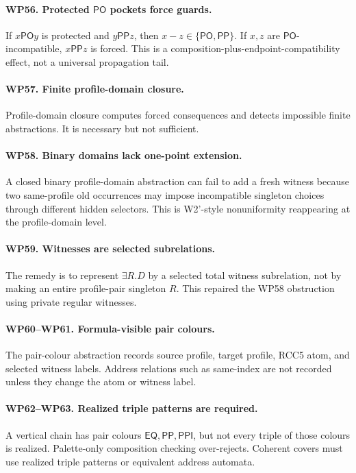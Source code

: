 \documentclass[11pt]{article}
\newcommand{\EQ}{\mathsf{EQ}}
\newcommand{\PP}{\mathsf{PP}}
\newcommand{\PPI}{\mathsf{PPI}}
\newcommand{\PO}{\mathsf{PO}}
\begin{document}
\paragraph{WP56. Protected $\PO$ pockets force guards.}
If $x\PO y$ is protected and $y\PP z$, then $x-z\in\{\PO,\PP\}$.  If $x,z$ are $\PO$-incompatible, $x\PP z$ is forced.  This is a composition-plus-endpoint-compatibility effect, not a universal propagation tail.

\paragraph{WP57. Finite profile-domain closure.}
Profile-domain closure computes forced consequences and detects impossible finite abstractions.  It is necessary but not sufficient.

\paragraph{WP58. Binary domains lack one-point extension.}
A closed binary profile-domain abstraction can fail to add a fresh witness because two same-profile old occurrences may impose incompatible singleton choices through different hidden selectors.  This is W2'-style nonuniformity reappearing at the profile-domain level.

\paragraph{WP59. Witnesses are selected subrelations.}
The remedy is to represent $\exists R.D$ by a selected total witness subrelation, not by making an entire profile-pair singleton $R$.  This repaired the WP58 obstruction using private regular witnesses.

\paragraph{WP60--WP61. Formula-visible pair colours.}
The pair-colour abstraction records source profile, target profile, RCC5 atom, and selected witness labels.  Address relations such as same-index are not recorded unless they change the atom or witness label.

\paragraph{WP62--WP63. Realized triple patterns are required.}
A vertical chain has pair colours $\EQ,\PP,\PPI$, but not every triple of those colours is realized.  Palette-only composition checking over-rejects.  Coherent covers must use realized triple patterns or equivalent address automata.
\end{document}
